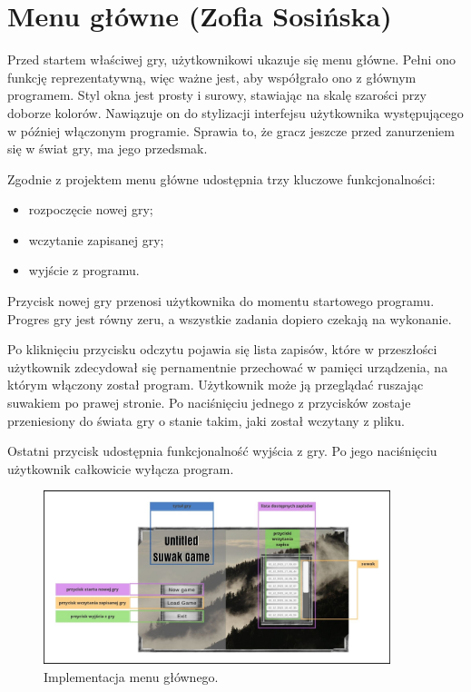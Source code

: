 \section{Menu główne (Zofia Sosińska)}\label{chap:menu_main}
Przed startem właściwej gry, użytkownikowi ukazuje się menu główne. Pełni ono funkcję reprezentatywną, więc ważne jest, aby współgrało ono z głównym programem.
Styl okna jest prosty i surowy, stawiając na skalę szarości przy doborze kolorów. Nawiązuje on do stylizacji interfejsu użytkownika występującego 
w później włączonym programie. Sprawia to, że gracz jeszcze przed zanurzeniem się w świat gry, ma jego przedsmak.

Zgodnie z projektem menu główne udostępnia trzy kluczowe funkcjonalności:
\begin{itemize}
    \item rozpoczęcie nowej gry;
    \item wczytanie zapisanej gry;
    \item wyjście z programu.
\end{itemize}

Przycisk nowej gry przenosi użytkownika do momentu startowego programu. Progres gry jest równy zeru, a wszystkie zadania dopiero czekają na wykonanie.

Po kliknięciu przycisku odczytu pojawia się lista zapisów, które w przeszłości użytkownik zdecydował się pernamentnie przechować w pamięci urządzenia, na którym
włączony został program. Użytkownik może ją przeglądać ruszając suwakiem po prawej stronie. Po naciśnięciu jednego z przycisków zostaje przeniesiony 
do świata gry o stanie takim, jaki został wczytany z pliku.

Ostatni przycisk udostępnia funkcjonalność wyjścia z gry. Po jego naciśnięciu użytkownik całkowicie wyłącza program.
\begin{figure}[htbp]
    \centering
    \includegraphics[width=0.9\textwidth]{images/ui/main_menu.png}
    \caption{Implementacja menu głównego.
    }\label{fig:compass}
\end{figure}
